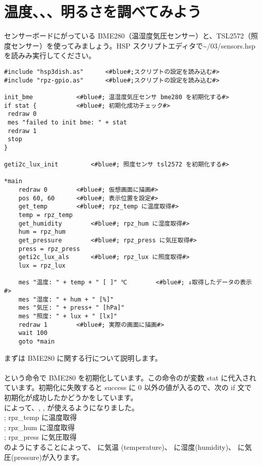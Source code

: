 \newpage
\section{温度、、、明るさを調べてみよう}\label{sec:sensors}
センサーボードにがっている BME280（温湿度気圧センサー）と、TSL2572（照度センサー）を使ってみましょう。HSP スクリプトエディタで\textasciitilde /03/sensors.hsp を読みみ実行してください。\\

\begin{lstlisting}[caption=\textasciitilde/03/sensors.hsp,label=sensors.hsp]
#include "hsp3dish.as"		<#blue#;スクリプトの設定を読み込む#>
#include "rpz-gpio.as"		<#blue#;スクリプトの設定を読み込む#>

init_bme			<#blue#; 温湿度気圧センサ bme280 を初期化する#>
if stat { 			<#blue#; 初期化成功チェック#>
 redraw 0
 mes "failed to init bme: " + stat
 redraw 1
 stop
}

geti2c_lux_init 		<#blue#; 照度センサ tsl2572 を初期化する#>

*main
	redraw 0 		<#blue#; 仮想画面に描画#>
	pos 60, 60 		<#blue#; 表示位置を設定#>
	get_temp		<#blue#; rpz_temp に温度取得#>
	temp = rpz_temp
	get_humidity		<#blue#; rpz_hum に湿度取得#>
	hum = rpz_hum
	get_pressure		<#blue#; rpz_press に気圧取得#>
	press = rpz_press
	geti2c_lux_als		<#blue#; rpz_lux に照度取得#>
	lux = rpz_lux

	mes "温度: " + temp + " [ ]" ℃		<#blue#; ↓取得したデータの表示#>
	mes "湿度: " + hum + " [%]"
	mes "気圧: " + press+ " [hPa]"
	mes "照度: " + lux + " [lx]"
	redraw 1		<#blue#; 実際の画面に描画#>
	wait 100
	goto *main
\end{lstlisting}

まずは BME280 に関する行について説明します。\\
\\
という命令で BME280 を初期化しています。この命令のが変数 stat に代入されています。初期化に失敗すると success に 0 以外の値が入るので、次の if 文で初期化が成功したかどうかをしています。\\
 によって、, ,  が使えるようになりました。\\
	; rpz\_temp に温度取得\\
	; rpz\_hum に湿度取得\\
	; rpz\_press に気圧取得\\
のようにすることによって、 に気温 (temperature)、  に湿度(humidity)、 に気圧(pressure)が入ります。

